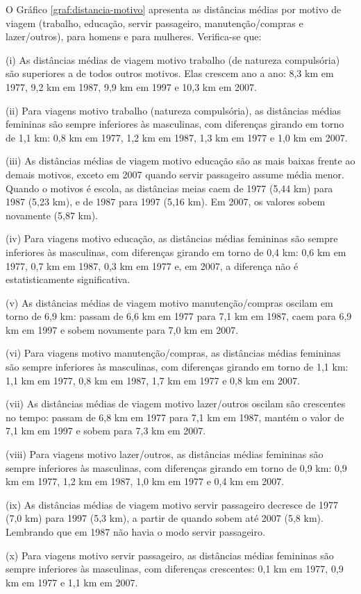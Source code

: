 O Gráfico \ref{graf:distancia-motivo} apresenta as distâncias médias por motivo de viagem (trabalho, educação, servir passageiro, manutenção/compras e lazer/outros), para homens e para mulheres. Verifica-se que:
\begin{compactitem}[]
\item (i) As distâncias médias de viagem motivo trabalho (de natureza compulsória) são superiores a de todos outros motivos. Elas crescem ano a ano: 8,3 km em 1977, 9,2 km em 1987, 9,9 km em 1997 e 10,3 km em 2007.
\item (ii) Para viagens motivo trabalho (natureza compulsória), as distâncias médias femininas são sempre inferiores às masculinas, com diferenças girando em torno de 1,1 km: 0,8 km em 1977, 1,2 km em 1987, 1,3 km em 1977 e 1,0 km em 2007.
\item (iii) As distâncias médias de viagem motivo educação são as mais baixas frente ao demais motivos, exceto em 2007 quando servir passageiro assume média menor. Quando o motivos é escola, as distâncias meias caem de 1977 (5,44 km) para 1987 (5,23 km), e de 1987 para 1997 (5,16 km). Em 2007, os valores sobem novamente (5,87 km).
\item (iv) Para viagens motivo educação, as distâncias médias femininas são sempre inferiores às masculinas, com diferenças girando em torno de 0,4 km: 0,6 km em 1977, 0,7 km em 1987, 0,3 km em 1977 e, em 2007, a diferença não é estatisticamente significativa.
\item (v) As distâncias médias de viagem motivo manutenção/compras oscilam em torno de 6,9 km: passam de 6,6 km em 1977 para 7,1 km em 1987, caem para 6,9 km em 1997 e sobem novamente para 7,0 km em 2007. 
\item (vi) Para viagens motivo manutenção/compras, as distâncias médias femininas são sempre inferiores às masculinas, com diferenças girando em torno de 1,1 km: 1,1 km em 1977, 0,8 km em 1987, 1,7 km em 1977 e 0,8 km em 2007.
\item (vii) As distâncias médias de viagem motivo lazer/outros oscilam são crescentes no tempo: passam de 6,8 km em 1977 para 7,1 km em 1987, mantém o valor de 7,1 km em 1997 e sobem para 7,3 km em 2007. 
\item (viii) Para viagens motivo lazer/outros, as distâncias médias femininas são sempre inferiores às masculinas, com diferenças girando em torno de 0,9 km: 0,9 km em 1977, 1,2 km em 1987, 1,0 km em 1977 e 0,4 km em 2007.
\item (ix) As distâncias médias de viagem motivo servir passageiro decresce de 1977 (7,0 km) para 1997 (5,3 km), a partir de quando sobem até 2007 (5,8 km). Lembrando que em 1987 não havia o modo servir passageiro.
\item (x) Para viagens motivo servir passageiro, as distâncias médias femininas são sempre inferiores às masculinas, com diferenças crescentes: 0,1 km em 1977, 0,9 km em 1977 e 1,1 km em 2007.
\end{compactitem}


